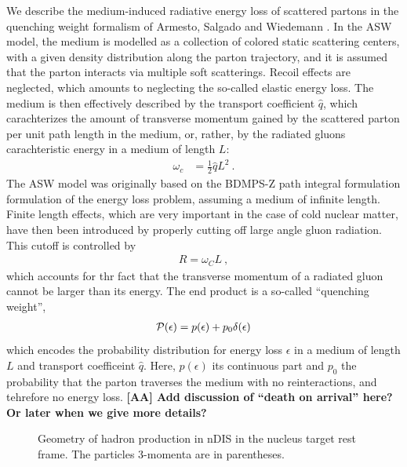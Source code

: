 We describe the medium-induced radiative energy loss of scattered partons in the quenching weight formalism of Armesto, Salgado and Wiedemann \cite{Salgado:2002cd,Salgado:2003gb,Armesto:2003jh}. In the ASW model, the medium is modelled as a collection of colored static scattering centers, with a given density distribution along the parton trajectory, and it is assumed that the parton interacts via multiple soft scatterings. Recoil effects are neglected, which amounts to neglecting the so-called elastic energy loss. 
The medium is then effectively described by the transport coefficient $\hat
q$, which carachterizes the amount of transverse momentum gained by the scattered parton per unit path length in the medium, or, rather, by the radiated gluons carachteristic energy in a medium of length $L$:
\begin{align}
  \omega_c & = \frac12 \hat q L^2 \ .
\end{align}
The ASW model was originally based on the BDMPS-Z path integral formulation formulation of the energy loss problem, assuming a medium of infinite length. Finite length effects, which are very important in the case of cold nuclear matter, have then been introduced by properly cutting off large angle gluon radiation. This cutoff is controlled by
\begin{align}
  R = \omega_C L \ ,   
\end{align}
which accounts for thr fact that the transverse momentum of a radiated gluon cannot be larger than its energy. The end product is a so-called ``quenching weight'', 
\begin{align}
  {\mathcal P}(\epsilon) = p(\epsilon) + p_0 \delta(\epsilon) 
\end{align}
which encodes the probability distribution for energy loss $\epsilon$ in a medium of length $L$ and transport coefficeint $\hat q$. Here, $p(\epsilon)$ its continuous part and $p_0$ the probability that the parton traverses the medium with no reinteractions, and tehrefore no energy loss. {\bf [AA] Add discussion of ``death on arrival'' here? Or later when we give more details?}

\begin{figure}[tbp]
  \centering
  \caption{Geometry of hadron production in nDIS in the nucleus 
    target rest frame. The particles 3-momenta are in parentheses.}
  \label{fig:DISgeom}
\end{figure}

